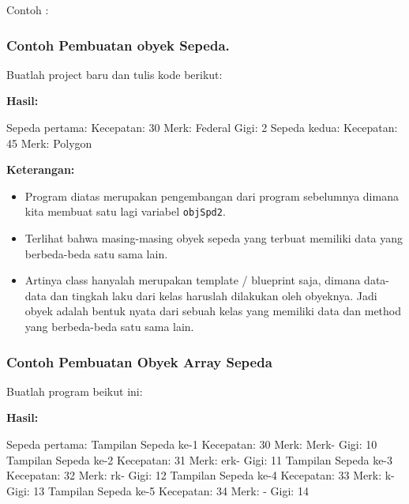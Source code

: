 Contoh :



\subsubsection*{Contoh Pembuatan obyek Sepeda.}

Buatlah project baru dan tulis kode berikut:



\textbf{Hasil:}

\begin{lcverbatim}
Sepeda pertama:
Kecepatan: 30
Merk: Federal
Gigi: 2
Sepeda kedua:
Kecepatan: 45
Merk: Polygon
\end{lcverbatim}

\textbf{Keterangan:}

\begin{itemize}

\item
 Program diatas merupakan pengembangan dari program sebelumnya dimana
 kita membuat satu lagi variabel \texttt{objSpd2}.
\item
 Terlihat bahwa masing-masing obyek sepeda yang terbuat memiliki data
 yang berbeda-beda satu sama lain.
\item
 Artinya class hanyalah merupakan template / blueprint saja, dimana
 data-data dan tingkah laku dari kelas haruslah dilakukan oleh
 obyeknya. Jadi obyek adalah bentuk nyata dari sebuah kelas yang
 memiliki data dan method yang berbeda-beda satu sama lain.
\end{itemize}

\subsubsection*{Contoh Pembuatan Obyek Array Sepeda}

Buatlah program beikut ini:



\textbf{Hasil:}
\begin{lcverbatim}
Sepeda pertama:
Tampilan Sepeda ke-1
Kecepatan: 30
Merk: Merk-
Gigi: 10
Tampilan Sepeda ke-2
Kecepatan: 31
Merk: erk-
Gigi: 11
Tampilan Sepeda ke-3
Kecepatan: 32
Merk: rk-
Gigi: 12
Tampilan Sepeda ke-4
Kecepatan: 33
Merk: k-
Gigi: 13
Tampilan Sepeda ke-5
Kecepatan: 34
Merk: -
Gigi: 14
\end{lcverbatim}

